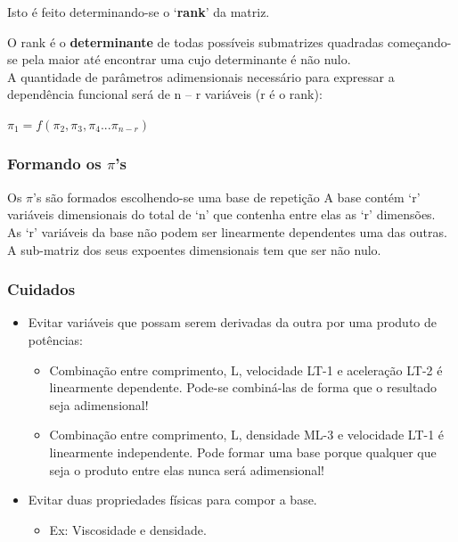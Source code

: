 \documentclass[a4paper, 12pt]{article}
\begin{document}
	
	Isto é feito determinando-se o ‘\textbf{rank}’ da matriz.
	
	O rank é o \textbf{determinante} de todas possíveis submatrizes quadradas começando-se pela maior até encontrar uma cujo determinante é não nulo.\\

	A quantidade de parâmetros adimensionais necessário para expressar a dependência funcional será de n – r variáveis (r é o rank):
	\begin{center}
		\Large
		$
		\pi_{1} = f(\pi_{2},\pi_{3},\pi_{4}...\pi_{n-r})
		$
	\end{center}
\subsubsection{Formando os $\pi$'s}
	Os $\pi$’s são formados escolhendo-se uma base de repetição
	A base contém ‘r’ variáveis dimensionais do total de ‘n’ que contenha entre elas as ‘r’ dimensões.\\
	
	As ‘r’ variáveis da base não podem ser linearmente dependentes uma das outras. A sub-matriz dos seus expoentes dimensionais tem que ser não nulo.
\subsubsection{Cuidados}
	\begin{itemize}
		\item Evitar variáveis que possam serem derivadas da outra por uma produto de potências:
			\begin{itemize}
				\item Combinação entre comprimento, L, velocidade LT-1 e aceleração LT-2 é linearmente dependente.
				Pode-se combiná-las de forma que o resultado seja adimensional!
				\item Combinação entre comprimento, L, densidade ML-3 e velocidade LT-1 é linearmente independente.
				Pode formar uma base porque qualquer que seja o produto entre elas nunca será adimensional!
			\end{itemize}
		
		\item Evitar duas propriedades físicas para compor a base.
			\begin{itemize}
				\item Ex: Viscosidade e densidade.
			\end{itemize}
	\end{itemize}
\end{document}
